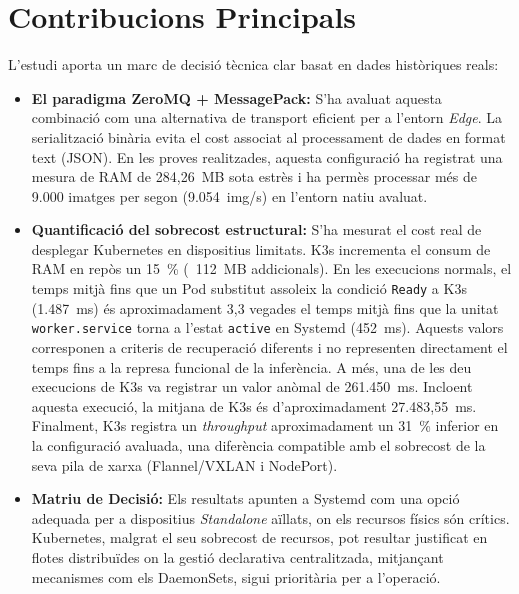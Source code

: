 \section{Contribucions Principals}
L'estudi aporta un marc de decisió tècnica clar basat en dades històriques reals:
\begin{itemize}
    \item \textbf{El paradigma ZeroMQ + MessagePack:} S'ha avaluat aquesta combinació com una alternativa de transport eficient per a l'entorn \textit{Edge}. La serialització binària evita el cost associat al processament de dades en format text (JSON). En les proves realitzades, aquesta configuració ha registrat una mesura de RAM de 284,26~MB sota estrès i ha permès processar més de 9.000 imatges per segon (9.054~img/s) en l'entorn natiu avaluat.
    \item \textbf{Quantificació del sobrecost estructural:} S'ha mesurat el cost real de desplegar Kubernetes en dispositius limitats. K3s incrementa el consum de RAM en repòs un 15~\% (~112~MB addicionals). En les execucions normals, el temps mitjà fins que un Pod substitut assoleix la condició \texttt{Ready} a K3s (1.487~ms) és aproximadament 3,3 vegades el temps mitjà fins que la unitat \texttt{worker.service} torna a l'estat \texttt{active} en Systemd (452~ms). Aquests valors corresponen a criteris de recuperació diferents i no representen directament el temps fins a la represa funcional de la inferència. A més, una de les deu execucions de K3s va registrar un valor anòmal de 261.450~ms. Incloent aquesta execució, la mitjana de K3s és d'aproximadament 27.483,55~ms. Finalment, K3s registra un \textit{throughput} aproximadament un 31~\% inferior en la configuració avaluada, una diferència compatible amb el sobrecost de la seva pila de xarxa (Flannel/VXLAN i NodePort).
    \item \textbf{Matriu de Decisió:} Els resultats apunten a Systemd com una opció adequada per a dispositius \textit{Standalone} aïllats, on els recursos físics són crítics. Kubernetes, malgrat el seu sobrecost de recursos, pot resultar justificat en flotes distribuïdes on la gestió declarativa centralitzada, mitjançant mecanismes com els DaemonSets, sigui prioritària per a l'operació.
\end{itemize}

